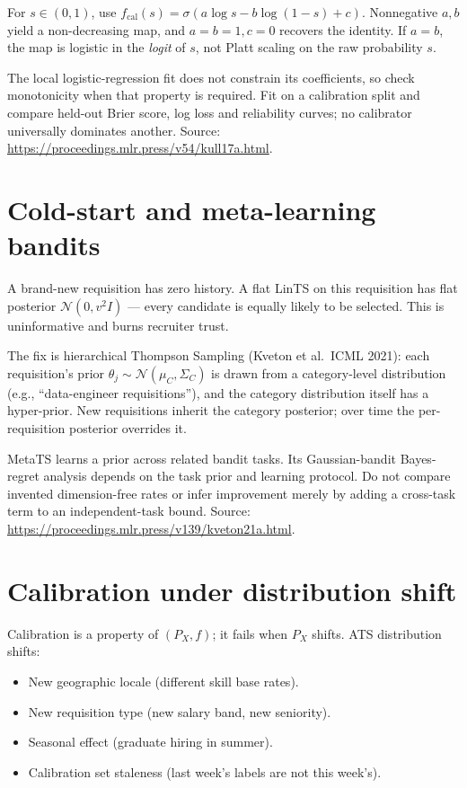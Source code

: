 \documentclass[11pt,oneside]{scrbook}
\begin{document}
\begin{definition}
For $s\in(0,1)$, use
$f_{\mathrm{cal}}(s)=\sigma(a\log s-b\log(1-s)+c)$.
Nonnegative $a,b$ yield a non-decreasing map, and $a=b=1,c=0$
recovers the identity. If $a=b$, the map is logistic in the \emph{logit}
of $s$, not Platt scaling on the raw probability $s$.
\end{definition}
The local logistic-regression fit does not constrain its coefficients,
so check monotonicity when that property is required. Fit on a calibration
split and compare held-out Brier score, log loss and reliability curves;
no calibrator universally dominates another.
Source: \url{https://proceedings.mlr.press/v54/kull17a.html}.

\section{Cold-start and meta-learning bandits}

A brand-new requisition has zero history. A flat LinTS on this requisition
has flat posterior $\mathcal{N}(0, v^2 I)$ --- every candidate is equally
likely to be selected. This is uninformative and burns recruiter trust.

The fix is hierarchical Thompson Sampling (Kveton et al.\ ICML 2021): each
requisition's prior $\theta_j \sim \mathcal{N}(\mu_C, \Sigma_C)$ is drawn
from a category-level distribution (e.g., ``data-engineer requisitions''),
and the category distribution itself has a hyper-prior. New requisitions
inherit the category posterior; over time the per-requisition posterior
overrides it.

\begin{remark}
MetaTS learns a prior across related bandit tasks. Its Gaussian-bandit
Bayes-regret analysis depends on the task prior and learning protocol.
Do not compare invented dimension-free rates or infer improvement merely
by adding a cross-task term to an independent-task bound.
Source: \url{https://proceedings.mlr.press/v139/kveton21a.html}.
\end{remark}

\section{Calibration under distribution shift}

Calibration is a property of $(P_X, f)$; it fails when $P_X$ shifts. ATS
distribution shifts:
\begin{itemize}\setlength\itemsep{1pt}
  \item New geographic locale (different skill base rates).
  \item New requisition type (new salary band, new seniority).
  \item Seasonal effect (graduate hiring in summer).
  \item Calibration set staleness (last week's labels are not this week's).
\end{itemize}
\end{document}
